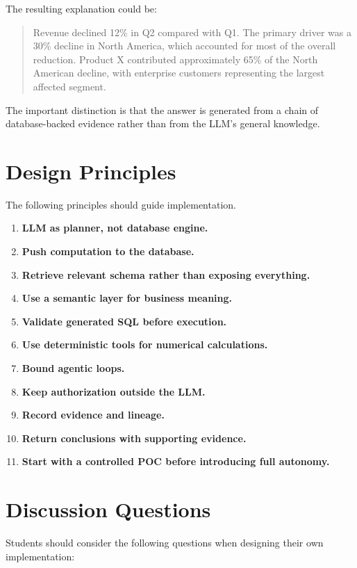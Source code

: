 \documentclass[11pt,a4paper]{article}
\begin{document}
The resulting explanation could be:

\begin{quote}
Revenue declined 12\% in Q2 compared with Q1. The primary driver was a
30\% decline in North America, which accounted for most of the overall
reduction. Product X contributed approximately 65\% of the North American
decline, with enterprise customers representing the largest affected segment.
\end{quote}

The important distinction is that the answer is generated from a chain of
database-backed evidence rather than from the LLM's general knowledge.

\section{Design Principles}

The following principles should guide implementation.

\begin{enumerate}
    \item \textbf{LLM as planner, not database engine.}
    \item \textbf{Push computation to the database.}
    \item \textbf{Retrieve relevant schema rather than exposing everything.}
    \item \textbf{Use a semantic layer for business meaning.}
    \item \textbf{Validate generated SQL before execution.}
    \item \textbf{Use deterministic tools for numerical calculations.}
    \item \textbf{Bound agentic loops.}
    \item \textbf{Keep authorization outside the LLM.}
    \item \textbf{Record evidence and lineage.}
    \item \textbf{Return conclusions with supporting evidence.}
    \item \textbf{Start with a controlled POC before introducing full autonomy.}
\end{enumerate}

\section{Discussion Questions}

Students should consider the following questions when designing their own
implementation:
\end{document}

